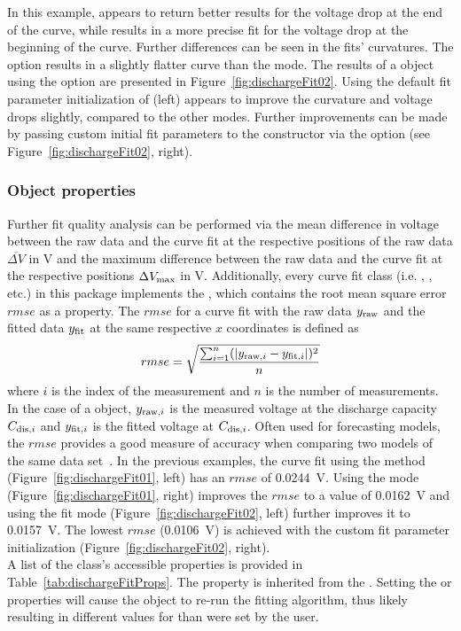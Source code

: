 In this example,  appears to return better results for the voltage drop at the end of the curve, while  results in a more precise fit for the voltage drop at the beginning of the curve. Further differences can be seen in the fits' curvatures. 
The  option results in a slightly flatter curve than the  mode. The results of a  object using the  option are presented in Figure~\ref{fig:dischargeFit02}.
Using the default fit parameter initialization of  (left) appears to improve the curvature and voltage drops slightly, compared to the other modes. Further improvements can be made by passing custom initial fit parameters to the constructor via the option  (see Figure~\ref{fig:dischargeFit02}, right).

\subsubsection{Object properties}
Further fit quality analysis can be performed via the mean difference in voltage between the raw data and the curve fit at the respective positions of the raw data $\overline{\Delta V}$ in V and the maximum difference between the raw data and the curve fit at the respective positions $\Delta V_\text{max}$ in V. Additionally, every curve fit class (i.e. , , etc.) in this package implements the , which contains the root mean square error $rmse$ as a property.
The $rmse$ for a curve fit with the raw data $y_\text{raw}$ and the fitted data $y_\text{fit}$ at the same respective $x$ coordinates is defined as
\begin{equation}
rmse = \sqrt{\frac{\sum_{i = 1}^{n}(|y_{\text{raw}, i}-y_{\text{fit}, i}|)^2}{n}}
\end{equation}
where $i$ is the index of the measurement and $n$ is the number of measurements. In the case of a  object, $y_{\text{raw}, i}$ is the measured voltage at the discharge capacity $C_{\text{dis}, i}$ and $y_{\text{fit}, i}$ is the fitted voltage at $C_{\text{dis}, i}$. Often used for forecasting models, the $rmse$ provides a good measure of accuracy when comparing two models of the same data set~\cite{hyndman_another_2006}.
In the previous examples, the curve fit using the  method (Figure~\ref{fig:dischargeFit01}, left) has an $rmse$ of 0.0244~V. Using the  mode (Figure~\ref{fig:dischargeFit01}, right) improves the $rmse$ to a value of 0.0162~V and using the fit mode  (Figure~\ref{fig:dischargeFit02}, left) further improves it to 0.0157~V.  The lowest $rmse$ (0.0106~V) is achieved with the custom fit parameter initialization (Figure~\ref{fig:dischargeFit02}, right). \\
A list of the class's accessible properties is provided in Table~\ref{tab:dischargeFitProps}. The  property is inherited from the . Setting the  or  properties will cause the object to re-run the fitting algorithm, thus likely resulting in different values for  than were set by the user.

